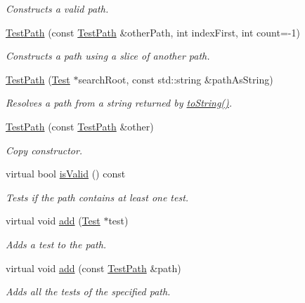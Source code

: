 \begin{DoxyCompactItemize}
\begin{DoxyCompactList}\small\item\em Constructs a valid path. \end{DoxyCompactList}\item 
\hyperlink{class_test_path_a88605df3449265ce0dd0533399cc2b6d}{Test\+Path} (const \hyperlink{class_test_path}{Test\+Path} \&other\+Path, int index\+First, int count=-\/1)
\begin{DoxyCompactList}\small\item\em Constructs a path using a slice of another path. \end{DoxyCompactList}\item 
\hyperlink{class_test_path_a5855701e39a328a19f9780a130106cb3}{Test\+Path} (\hyperlink{class_test}{Test} $\ast$search\+Root, const std\+::string \&path\+As\+String)
\begin{DoxyCompactList}\small\item\em Resolves a path from a string returned by \hyperlink{class_test_path_a81fd857b678a51a56db150b5c4d32971}{to\+String()}. \end{DoxyCompactList}\item 
\hyperlink{class_test_path_a616f81a2ed0ddeb1dbb6f83d0b58ee47}{Test\+Path} (const \hyperlink{class_test_path}{Test\+Path} \&other)
\begin{DoxyCompactList}\small\item\em Copy constructor. \end{DoxyCompactList}\item 
virtual bool \hyperlink{class_test_path_aca6ad4784df09af24573890d2d145435}{is\+Valid} () const 
\begin{DoxyCompactList}\small\item\em Tests if the path contains at least one test. \end{DoxyCompactList}\item 
virtual void \hyperlink{class_test_path_a0a8a6273d18f76da2c7e2dedf61b3f7b}{add} (\hyperlink{class_test}{Test} $\ast$test)
\begin{DoxyCompactList}\small\item\em Adds a test to the path. \end{DoxyCompactList}\item 
virtual void \hyperlink{class_test_path_a679447e57ea80c9a767a41f0b723b427}{add} (const \hyperlink{class_test_path}{Test\+Path} \&path)
\begin{DoxyCompactList}\small\item\em Adds all the tests of the specified path. \end{DoxyCompactList}\item 

\end{DoxyCompactItemize}
